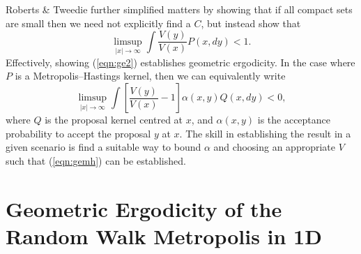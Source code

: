\documentclass{article}
\begin{document}
Roberts \& Tweedie \cite{roberts1996geometric} further simplified matters by showing that if all compact sets are small then we need not explicitly find a $C$, but instead show that
\begin{equation} \label{eqn:ge2}
\limsup_{|x| \to \infty} \int \frac{V(y)}{V(x)} P(x,dy) < 1.
\end{equation}
Effectively, showing (\ref{eqn:ge2}) establishes geometric ergodicity.  In the case where $P$ is a Metropolis--Hastings kernel, then we can equivalently write
\begin{equation} \label{eqn:gemh}
\limsup_{|x| \to \infty} \int \left[ \frac{V(y)}{V(x)} - 1 \right] \alpha(x,y)Q(x,dy) < 0,
\end{equation}
where $Q$ is the proposal kernel centred at $x$, and $\alpha(x,y)$ is the acceptance probability to accept the proposal $y$ at $x$.  The skill in establishing the result in a given scenario is find a suitable way to bound $\alpha$ and choosing an appropriate $V$ such that (\ref{eqn:gemh}) can be established.

\section{Geometric Ergodicity of the Random Walk Metropolis in 1D}
\end{document}
